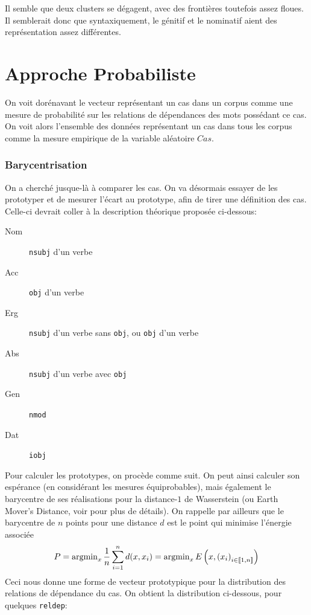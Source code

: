 \documentclass{cours}
\begin{document}
    Il semble que deux clusters se dégagent, avec des frontières toutefois assez floues.
    Il semblerait donc que syntaxiquement, le génitif et le nominatif aient des représentation assez différentes.

\newpage
\part{Approche Probabiliste}
	On voit dorénavant le vecteur représentant un cas dans un corpus comme une mesure de probabilité sur les relations de dépendances des mots possédant ce cas.
    On voit alors l'ensemble des données représentant un cas dans tous les corpus comme la mesure empirique de la variable aléatoire $Cas$.

\section{Barycentrisation}
    On a cherché jusque-là à comparer les cas.
    On va désormais essayer de les prototyper et de mesurer l'écart au prototype, afin de tirer une définition des cas.
    Celle-ci devrait coller à la description théorique proposée ci-dessous:

    \begin{multicols}{2}
        \begin{description}
            \item[Nom] \texttt{nsubj} d'un verbe
            \item[Acc] \texttt{obj} d'un verbe
            \item[Erg] \texttt{nsubj} d'un verbe sans \texttt{obj}, ou \texttt{obj} d'un verbe
            \item[Abs] \texttt{nsubj} d'un verbe avec \texttt{obj}      
            \item[Gen] \texttt{nmod}
            \item[Dat] \texttt{iobj}
        \end{description}
    \end{multicols}
    Pour calculer les prototypes, on procède comme suit.
    On peut ainsi calculer son espérance (en considérant les mesures équiprobables), mais également le barycentre de ses réalisations pour la distance-$1$ de Wasserstein (ou Earth Mover's Distance, voir \cite{PythonPOT} pour plus de détails).
    On rappelle par ailleurs que le barycentre de $n$ points pour une distance $d$ est le point qui minimise l'énergie associée
    \begin{equation*}
        P = \operatorname{argmin}_{x} \frac{1}{n}\sum_{i = 1}^{n} d(x, x_{i}) = \operatorname{argmin}_{x} E\left(x, \left(x_{i}\right)_{i \in \left\llbracket 1, n\right\rrbracket}\right)
    \end{equation*}
    Ceci nous donne une forme de vecteur prototypique pour la distribution des relations de dépendance du cas.
    On obtient la distribution ci-dessous, pour quelques \texttt{reldep}:
\end{document}

